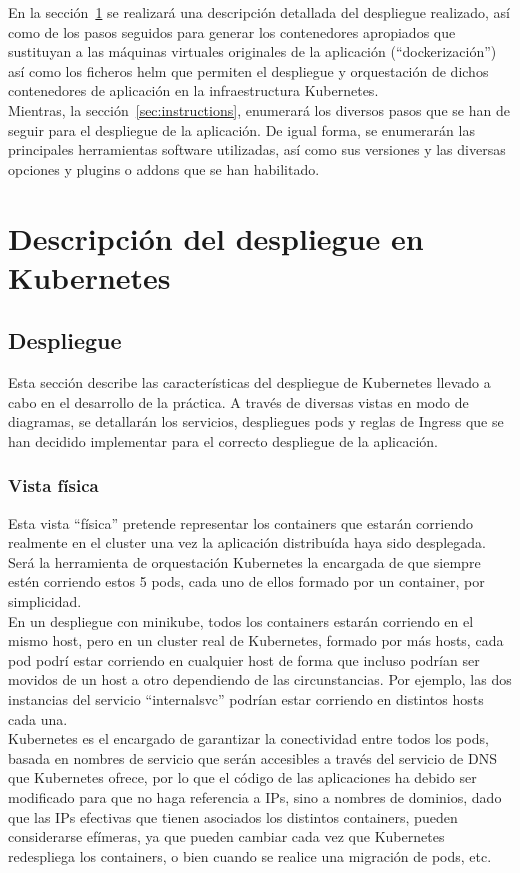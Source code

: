 \documentclass[12pt,spanish]{article}
\begin{document}
En la sección~\ref{sec:deployment} se realizará una descripción detallada del despliegue realizado, así como de los pasos seguidos para generar los contenedores apropiados que sustituyan a las máquinas virtuales originales de la aplicación (``dockerización'') así como los ficheros helm que permiten el despliegue y orquestación de dichos contenedores de aplicación en la infraestructura Kubernetes.\\

Mientras, la sección~\ref{sec:instructions}, enumerará los diversos pasos que se han de seguir para el despliegue de la aplicación. De igual forma, se enumerarán las principales herramientas software utilizadas, así como sus versiones y las diversas opciones y plugins o addons que se han habilitado.

\pagebreak
\section{Descripción del despliegue en Kubernetes}
\label{sec:deployment}

\subsection{Despliegue}

Esta sección describe las características del despliegue de Kubernetes llevado a cabo en el desarrollo de la práctica. A través de diversas vistas en modo de diagramas, se detallarán los servicios, despliegues pods y reglas de Ingress que se han decidido implementar para el correcto despliegue de la aplicación.

\subsubsection{Vista física}

Esta vista ``física'' pretende representar los containers que estarán corriendo realmente en el cluster una vez la aplicación distribuída haya sido desplegada. Será la herramienta de orquestación Kubernetes la encargada de que siempre estén corriendo estos 5 pods, cada uno de ellos formado por un container, por simplicidad.\\
En un despliegue con minikube, todos los containers estarán corriendo en el mismo host, pero en un cluster real de Kubernetes, formado por  más hosts, cada pod podrí estar corriendo en cualquier host de forma que incluso podrían ser movidos de un host a otro dependiendo de las circunstancias. Por ejemplo, las dos instancias del servicio “internalsvc” podrían estar corriendo en distintos hosts cada una.\\
Kubernetes es el encargado de garantizar la conectividad entre todos los pods, basada en nombres de servicio que serán accesibles a través del servicio de DNS que Kubernetes ofrece, por lo que el código de las aplicaciones ha debido ser modificado para que no haga referencia a IPs, sino a nombres de dominios, dado que las IPs efectivas que tienen asociados los distintos containers, pueden considerarse efímeras, ya que pueden cambiar cada vez que Kubernetes redespliega los containers, o bien cuando se realice una migración de pods, etc.
\end{document}
